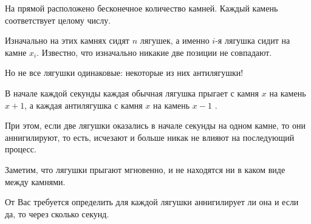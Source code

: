 На прямой расположено бесконечное количество камней. Каждый камень соответствует целому числу.

Изначально на этих камнях сидят $n$ лягушек, а именно $i$-я лягушка сидит на камне $x_i$. Известно, что изначально никакие две позиции не совпадают.

Но не все лягушки одинаковые: некоторые из них антилягушки!

В начале каждой секунды каждая обычная лягушка прыгает с камня $x$ на камень $x+1$, а каждая антилягушка с камня $x$ на камень $x-1$ .

При этом, если две лягушки оказались в начале секунды на одном камне, то они аннигилируют, то есть, исчезают и больше никак не влияют на последующий процесс.

Заметим, что лягушки прыгают мгновенно, и не находятся ни в каком виде между камнями.

От Вас требуется определить для каждой лягушки аннигилирует ли она и если да, то через сколько секунд.